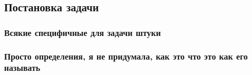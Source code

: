 \begin{definition}

\TODO

\end{definition}

\subsection{Постановка задачи}

\subsubsection{Всякие специфичные для задачи штуки}

\begin{definition}

\TODO

\end{definition}

\begin{definition}

\TODO

\end{definition}


\subsubsection{Просто определения, я не придумала, как это что это как его называть}

\begin{definition}
    \TODO
\end{definition}
